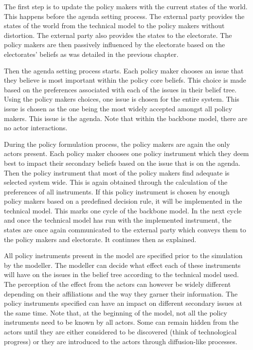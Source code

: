 The first step is to update the policy makers with the current states of the world. This happens before the agenda setting process. The external party provides the states of the world from the technical model to the policy makers without distortion. The external party also provides the states to the electorate. The policy makers are then passively influenced by the electorate based on the electorates' beliefs as was detailed in the previous chapter.
 
Then the agenda setting process starts. Each policy maker chooses an issue that they believe is most important within the policy core beliefs. This choice is made based on the preferences associated with each of the issues in their belief tree. Using the policy makers choices, one issue is chosen for the entire system. This issue is chosen as the one being the most widely accepted amongst all policy makers. This issue is the agenda. Note that within the backbone model, there are no actor interactions.
 
During the policy formulation process, the policy makers are again the only actors present. Each policy maker chooses one policy instrument which they deem best to impact their secondary beliefs based on the issue that is on the agenda. Then the policy instrument that most of the policy makers find adequate is selected system wide. This is again obtained through the calculation of the preferences of all instruments. If this policy instrument is chosen by enough policy makers based on a predefined decision rule, it will be implemented in the technical model. This marks one cycle of the backbone model. In the next cycle and once the technical model has run with the implemented instrument, the states are once again communicated to the external party which conveys them to the policy makers and electorate. It continues then as explained.
 
All policy instruments present in the model are specified prior to the simulation by the modeller. The modeller can decide what effect each of these instruments will have on the issues in the belief tree according to the technical model used. The perception of the effect from the actors can however be widely different depending on their affiliations and the way they garner their information. The policy instruments specified can have an impact on different secondary issues at the same time. Note that, at the beginning of the model, not all the policy instruments need to be known by all actors. Some can remain hidden from the actors until they are either considered to be discovered (think of technological progress) or they are introduced to the actors through diffusion-like processes.


